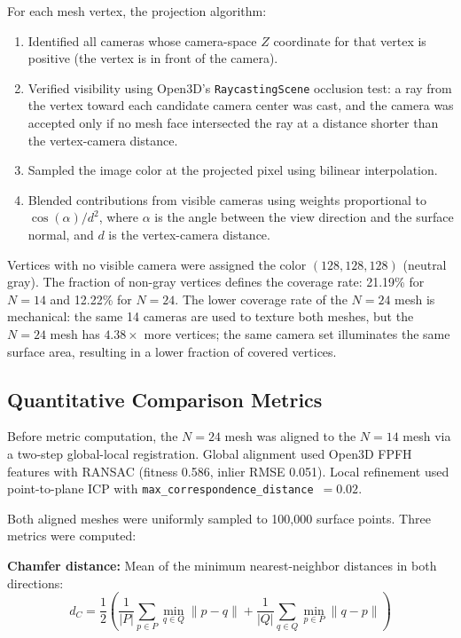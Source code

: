 \documentclass[12pt]{article}
\begin{document}
For each mesh vertex, the projection algorithm:
\begin{enumerate}
    \item Identified all cameras whose camera-space $Z$ coordinate for that vertex is positive (the vertex is in front of the camera).
    \item Verified visibility using Open3D's \texttt{RaycastingScene} occlusion test: a ray from the vertex toward each candidate camera center was cast, and the camera was accepted only if no mesh face intersected the ray at a distance shorter than the vertex-camera distance.
    \item Sampled the image color at the projected pixel using bilinear interpolation.
    \item Blended contributions from visible cameras using weights proportional to $\cos(\alpha) / d^2$, where $\alpha$ is the angle between the view direction and the surface normal, and $d$ is the vertex-camera distance.
\end{enumerate}

Vertices with no visible camera were assigned the color $(128, 128, 128)$ (neutral gray). The fraction of non-gray vertices defines the coverage rate: 21.19\% for $N{=}14$ and 12.22\% for $N{=}24$. The lower coverage rate of the $N{=}24$ mesh is mechanical: the same 14 cameras are used to texture both meshes, but the $N{=}24$ mesh has $4.38\times$ more vertices; the same camera set illuminates the same surface area, resulting in a lower fraction of covered vertices.

\subsection{Quantitative Comparison Metrics}
\label{subsec:metrics}

Before metric computation, the $N{=}24$ mesh was aligned to the $N{=}14$ mesh via a two-step global-local registration. Global alignment used Open3D FPFH features with RANSAC (fitness 0.586, inlier RMSE 0.051). Local refinement used point-to-plane ICP with \texttt{max\_correspondence\_distance}~$= 0.02$.

Both aligned meshes were uniformly sampled to 100,000 surface points. Three metrics were computed:

\textbf{Chamfer distance:} Mean of the minimum nearest-neighbor distances in both directions:
\begin{equation}
    d_C = \frac{1}{2}\left( \frac{1}{|P|}\sum_{p \in P} \min_{q \in Q} \|p - q\| + \frac{1}{|Q|}\sum_{q \in Q} \min_{p \in P} \|q - p\| \right)
\end{equation}
\end{document}
